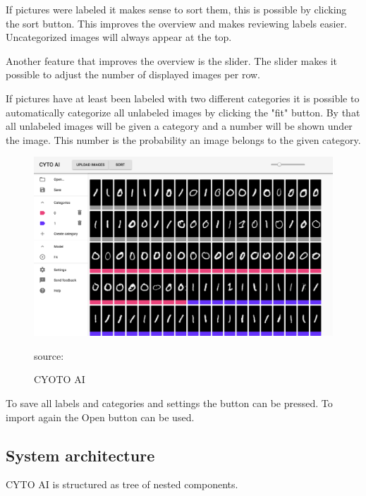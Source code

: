 If pictures were labeled it makes sense to sort them, this is possible by clicking the sort button. This improves the overview and makes reviewing labels easier. Uncategorized images will always appear at the top.

Another feature that improves the overview is the slider. The slider makes it possible to adjust the number of displayed images per row. 

If pictures have at least been labeled with two different categories it is possible to automatically categorize all unlabeled images by clicking the "fit" button. By that all unlabeled images will be given a category and a number will be shown under the image. This number is the probability an image belongs to the given category.

\begin{figure}[H]
	\centering
	\includegraphics[width=0.8\linewidth]{bilder/cyto/cyto.png}
	\caption{CYOTO AI} source:\cite{Component}
	\label{fig:COMPONENT}
\end{figure}

To save all labels and categories and settings the button can be pressed. To import again the Open button can be used.


\subsection{System architecture}
CYTO AI is structured as tree of nested components. 

